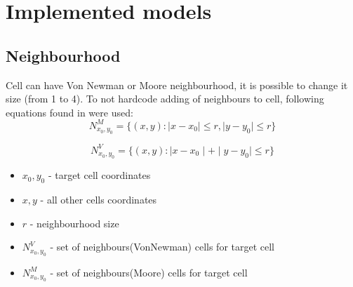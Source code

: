 \documentclass[a4paper, 11pt]{article}
\begin{document}
	



\section{Implemented models}
\subsection{Neighbourhood}
Cell can have Von Newman or Moore neighbourhood, it is possible to change it size (from 1 to 4).
To not hardcode adding of neighbours to cell, following equations found in \cite{moore}\cite{vonnewman} were used:\\
\begin{equation}
	N^{M}_{x_0,y_0}=\{ \left(x,y\right): \mid x-x_0 \mid \leq r, \mid y-y_0 \mid \leq r   \}  
\end{equation}

\begin{equation}
	N^{V}_{x_0,y_0}=\{ \left(x,y\right): \mid x-x_0 \mid + \mid y-y_0 \mid \leq r   \} 
\end{equation}

\begin{itemize}
	\item $x_0,y_0$ - target cell coordinates
	\item $x,y$ - all other cells coordinates
	\item $r$ - neighbourhood size	
	\item $N^{V}_{x_0,y_0}$ - set of neighbours(VonNewman) cells for target cell
	\item $N^{M}_{x_0,y_0}$ - set of neighbours(Moore) cells for target cell
\end{itemize}
\end{document}
